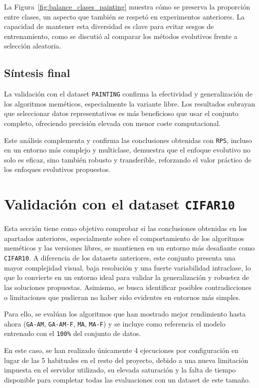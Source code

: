 La Figura~\ref{fig:balance_clases_painting} muestra cómo se preserva la proporción entre clases,
un aspecto que también se respetó en experimentos anteriores.
La capacidad de mantener esta diversidad es clave para evitar sesgos de entrenamiento,
como se discutió al comparar los métodos evolutivos frente a selección aleatoria.

\subsection{Síntesis final}
La validación con el dataset \texttt{PAINTING} confirma la efectividad y generalización de los algoritmos meméticos, especialmente la variante libre.
Los resultados subrayan que seleccionar datos representativos es más beneficioso que usar el conjunto completo, ofreciendo precisión elevada con menor coste computacional.

Este análisis complementa y confirma las conclusiones obtenidas con \texttt{RPS}, incluso en un entorno más complejo y multiclase,
demuestra que el enfoque evolutivo no solo es eficaz, sino también robusto y transferible,
reforzando el valor práctico de los enfoques evolutivos propuestos.


\section{Validación con el dataset \texttt{CIFAR10}}
Esta sección tiene como objetivo comprobar si las conclusiones obtenidas en los apartados anteriores,
especialmente sobre el comportamiento de los algoritmos meméticos y las versiones libres, se mantienen en un entorno más desafiante como \texttt{CIFAR10}.
A diferencia de los datasets anteriores, este conjunto presenta una mayor complejidad visual,
baja resolución y una fuerte variabilidad intraclase, lo que lo convierte en un entorno ideal para validar la generalización y robustez de las soluciones propuestas.
Asimismo, se busca identificar posibles contradicciones o limitaciones que pudieran no haber sido evidentes en entornos más simples.

Para ello, se evalúan los algoritmos que han mostrado mejor rendimiento hasta ahora (\texttt{GA-AM}, \texttt{GA-AM-F}, \texttt{MA}, \texttt{MA-F})
y se incluye como referencia el modelo entrenado con el \texttt{100\%} del conjunto de datos.

En este caso, se han realizado únicamente 4 ejecuciones por configuración en lugar de las 5 habituales en el resto del proyecto,
debido a una nueva limitación impuesta en el servidor utilizado, su elevada saturación y la falta de tiempo disponible para completar todas las evaluaciones con un dataset de este tamaño.

